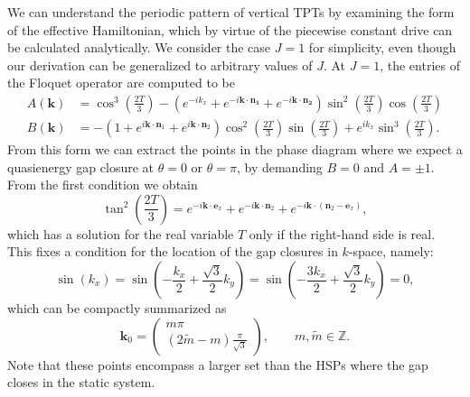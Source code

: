 \documentclass[aps,prb,twocolumn,superscriptaddress,groupedaddress]{revtex4}
\begin{document}
We can understand the periodic pattern of vertical TPTs by examining the form of the effective Hamiltonian, which by virtue of the piecewise constant drive can be calculated analytically.
We consider the case $J=1$ for simplicity, even though our derivation can be generalized to arbitrary values of $J$.
At $J=1$, the entries of the Floquet operator are computed to be
%
\begin{align}
{\scriptstyle A(\mathbf{k})} &= {\scriptstyle \cos^3 \left( \frac{2T}{3} \right)  - \left( e^{-i k_x} + e^{-i \mathbf{k} \cdot \mathbf{n_1}} + e^{-i \mathbf{k} \cdot \mathbf{n_2}} \right) \sin^2 \left( \frac{2T}{3} \right)  \cos \left( \frac{2T}{3} \right) } \label{entry-A-Floquet-op-Kitaev-honeycomb} \\
{\scriptstyle B(\mathbf{k})} &= {\scriptstyle - \left( 1 + e^{i \mathbf{k} \cdot \mathbf{n}_1} + e^{i \mathbf{k} \cdot \mathbf{n}_2} \right) \cos^2 \left( \frac{2T}{3} \right) \sin \left( \frac{2T}{3} \right) + e^{i k_x}  \sin^3\left( \frac{2T}{3} \right)}.
\end{align}
From this form we can extract the points in the phase diagram where we expect a quasienergy gap closure at $\theta=0$ or $\theta=\pi$, by demanding $B = 0$ and $A = \pm 1$.
From the first condition we obtain
%
\begin{equation}
\tan^2 \left( \frac{2T}{3} \right) = e^{-i \mathbf{k} \cdot \mathbf{e}_x} + e^{-i \mathbf{k} \cdot \mathbf{n}_2}  + e^{-i \mathbf{k} \cdot (\mathbf{n}_2 - \mathbf{e}_x)},
\label{condition-gap-closures-kitaev-honeycomb}
\end{equation}
%
which has a solution for the real variable $T$ only if the right-hand side is real.
This fixes a condition for the location of the gap closures in $k$-space, namely:
%
\begin{equation}
{\scriptstyle
\sin(k_x) = \sin \left( - \frac{k_x}{2} + \frac{\sqrt{3}}{2} k_y \right) = \sin \left( - \frac{3k_x}{2} + \frac{\sqrt{3}}{2} k_y \right) = 0,}
\end{equation}
%
which can be compactly summarized as
%
\begin{equation}
\mathbf{k}_0 = \left( \begin{array}{c}
m \pi \\
(2\tilde{m} -m) \frac{\pi}{\sqrt{3}} 
\end{array}
\right), \qquad m, \tilde{m} \in \mathbb{Z}.
\label{gap-closure-points-Kitaev-honeycomb}
\end{equation}
%
Note that these points encompass a larger set than the HSPs where the gap closes in the static system.
\end{document}
